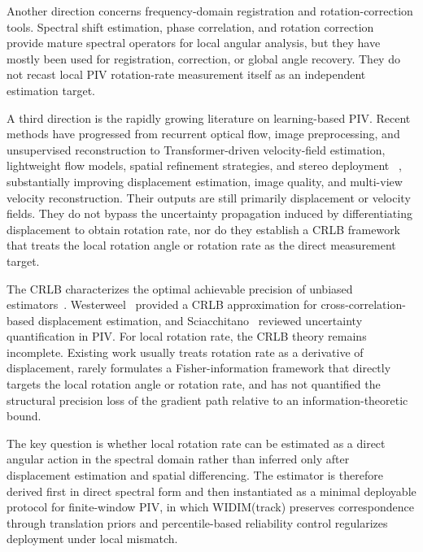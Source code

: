 \documentclass[lettersize,journal]{IEEEtran}
\begin{document}
Another direction concerns frequency-domain registration and rotation-correction tools.
Spectral shift estimation, phase correlation, and rotation correction~\cite{Tong2019,Guizar2008,Nie2023RotationCorrection}
provide mature spectral operators for local angular analysis,
but they have mostly been used for registration, correction, or global angle recovery.
They do not recast local PIV rotation-rate measurement itself as an independent estimation target.

A third direction is the rapidly growing literature on learning-based PIV.
Recent methods have progressed from recurrent optical flow, image preprocessing, and unsupervised reconstruction
to Transformer-driven velocity-field estimation, lightweight flow models, spatial refinement strategies, and stereo deployment
~\cite{Lagemann2022Generalization,Fan2023PIVPreprocess,Shan2024PIVOpticalFlow,Yu2024AttentionalPIV,Reddy2025TwinsPIVNet,Shan2025Lightweight,Choi2023SpatialRefinement,Elrefaie2024StereoPIV,Ji2024,Prakosa2025,Huettig2024,Cai2024},
substantially improving displacement estimation, image quality, and multi-view velocity reconstruction.
Their outputs are still primarily displacement or velocity fields.
They do not bypass the uncertainty propagation induced by differentiating displacement to obtain rotation rate,
nor do they establish a CRLB framework that treats the local rotation angle or rotation rate as the direct measurement target.

The CRLB characterizes the optimal achievable precision of unbiased estimators~\cite{Kay1993}.
Westerweel~\cite{Westerweel1997} provided a CRLB approximation for cross-correlation-based displacement estimation,
and Sciacchitano~\cite{Sciacchitano2019} reviewed uncertainty quantification in PIV.
For local rotation rate, the CRLB theory remains incomplete.
Existing work usually treats rotation rate as a derivative of displacement,
rarely formulates a Fisher-information framework that directly targets the local rotation angle or rotation rate,
and has not quantified the structural precision loss of the gradient path relative to an information-theoretic bound.

The key question is whether local rotation rate can be estimated as a direct angular action in the spectral domain rather than inferred only after displacement estimation and spatial differencing.
The estimator is therefore derived first in direct spectral form and then instantiated as a minimal deployable protocol for finite-window PIV, in which WIDIM(track) preserves correspondence through translation priors and percentile-based reliability control regularizes deployment under local mismatch.
\end{document}
